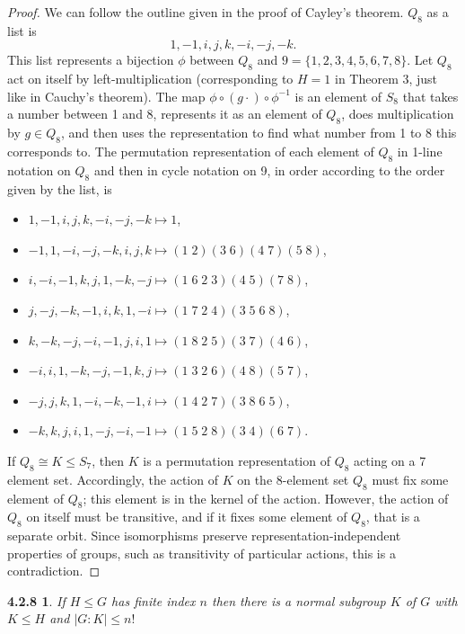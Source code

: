 \documentclass{article}
\newtheorem*{4.2.8}{4.2.8}
\begin{document}
\begin{proof}
  We can follow the outline given in the proof of Cayley's theorem.
  $Q_{8}$ as a list is
  \[
    1, -1, i, j, k, -i, -j, -k.
  \]
  This list represents a bijection $\phi$ between $Q_{8}$ and $9 = \{1, 2, 3, 4, 5, 6 , 7, 8\}$.
  Let $Q_{8}$ act on itself by left-multiplication (corresponding to $H = 1$ in Theorem 3, just like in Cauchy's theorem).
  The map $\phi \circ (g\cdot) \circ \phi^{-1}$ is an element of $S_{8}$ that takes a number between 1 and 8, represents it as an element of $Q_{8}$,
  does multiplication by $g \in Q_{8}$, and then uses the representation to find what number from 1 to 8 this corresponds to.
  The permutation representation of each element of $Q_{8}$ in 1-line notation on $Q_{8}$ and then in cycle notation on 9,
  in order according to the order given by the list, is
  \begin{itemize}
  \item $1, -1, i, j, k, -i, -j, -k \mapsto 1$,
  \item $-1, 1, -i, -j, -k, i, j, k \mapsto (1 \; 2)(3 \; 6)(4 \; 7)(5 \; 8)$,
  \item $i, -i, -1, k, j, 1, -k, -j \mapsto (1 \; 6 \; 2 \; 3)(4 \; 5)(7 \; 8)$,
  \item $j, -j, -k, -1, i, k, 1, -i \mapsto (1 \; 7 \; 2 \; 4)(3 \; 5 \; 6 \; 8)$,
  \item $k, -k, -j, -i, -1, j, i, 1 \mapsto (1 \; 8 \; 2 \; 5)(3 \; 7)(4 \; 6)$,
  \item $-i, i, 1, -k, -j, -1, k, j \mapsto (1 \; 3 \; 2 \; 6)(4 \; 8)(5 \; 7)$,
  \item $-j, j, k, 1, -i, -k, -1, i \mapsto (1 \; 4 \; 2 \; 7)(3 \; 8 \; 6 \; 5)$,
  \item $-k, k, j, i, 1, -j, -i, -1 \mapsto (1 \; 5 \; 2 \; 8)(3 \; 4)(6 \; 7)$.
  \end{itemize}

  If $Q_{8} \cong K \leq S_{7}$, then $K$ is a permutation representation of $Q_{8}$ acting on a 7 element set.
  Accordingly, the action of $K$ on the 8-element set $Q_{8}$ must fix some element of $Q_{8}$; this element is in the kernel of the action.
  However, the action of $Q_{8}$ on itself must be transitive, and if it fixes some element of $Q_{8}$, that is a separate orbit.
  Since isomorphisms preserve representation-independent properties of groups, such as transitivity of particular actions, this is a contradiction.
\end{proof}

\begin{4.2.8}
  If $H \leq G$ has finite index $n$ then there is a normal subgroup $K$ of $G$ with $K \leq H$ and $|G:K|\leq n!$
\end{4.2.8}
\end{document}

